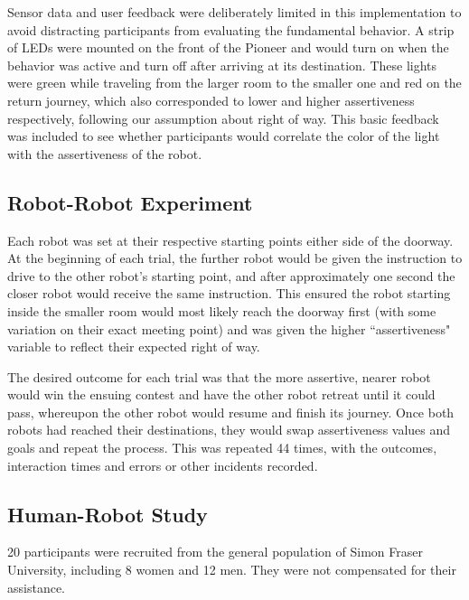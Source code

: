 \documentclass[letterpaper, 10 pt, conference]{ieeeconf}  %
\begin{document}
Sensor data and user feedback were deliberately limited in this implementation to avoid distracting participants from evaluating the fundamental behavior. A strip of LEDs were mounted on the front of the Pioneer and would turn on when the behavior was active and turn off after arriving at its destination. These lights were green while traveling from the larger room to the smaller one and red on the return journey, which also corresponded to lower and higher assertiveness respectively, following our assumption about right of way. This basic feedback was included to see whether participants would correlate the color of the light with the assertiveness of the robot.


\subsection{Robot-Robot Experiment}

Each robot was set at their respective starting points either side of the doorway. At the beginning of each trial, the further robot would be given the instruction to drive to the other robot’s starting point, and after approximately one second the closer robot would receive the same instruction. This ensured the robot starting inside the smaller room would most likely reach the doorway first (with some variation on their exact meeting point) and was given the higher ``assertiveness" variable to reflect their expected right of way.

The desired outcome for each trial was that the more assertive, nearer robot would win the ensuing contest and have the other robot retreat until it could pass, whereupon the other robot would resume and finish its journey. Once both robots had reached their destinations, they would swap assertiveness values and goals and repeat the process. This was repeated 44 times, with the outcomes, interaction times and errors or other incidents recorded. 


\subsection{Human-Robot Study}

20 participants were recruited from the general population of Simon Fraser University, including 8 women and 12 men. They were not compensated for their assistance.
\end{document}

